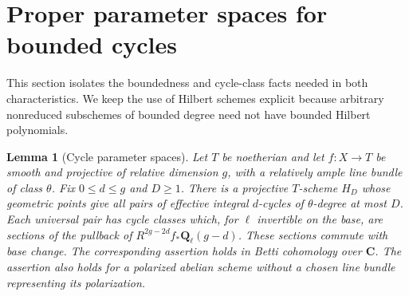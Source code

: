 \documentclass[11pt]{article}
\newtheorem{lemma}[theorem]{Lemma}
\theoremstyle{definition}
\theoremstyle{remark}
\newcommand{\Q}{\mathbf Q}
\newcommand{\C}{\mathbf C}
\begin{document}


\section{Proper parameter spaces for bounded cycles}
\label{sec:parameters}

This section isolates the boundedness and cycle-class facts needed in both characteristics. We keep the use of Hilbert schemes explicit because arbitrary nonreduced subschemes of bounded degree need not have bounded Hilbert polynomials.

\begin{lemma}[Cycle parameter spaces]\label{lem:parameters}
Let $T$ be noetherian and let $f:X\to T$ be smooth and projective of relative dimension $g$, with a relatively ample line bundle of class $\theta$. Fix $0\leq d\leq g$ and $D\geq1$. There is a projective $T$-scheme $H_D$ whose geometric points give all pairs of effective integral $d$-cycles of $\theta$-degree at most $D$. Each universal pair has cycle classes which, for $\ell$ invertible on the base, are sections of the pullback of $R^{2g-2d}f_*\Q_\ell(g-d)$. These sections commute with base change. The corresponding assertion holds in Betti cohomology over $\C$. The assertion also holds for a polarized abelian scheme without a chosen line bundle representing its polarization.
\end{lemma}
\end{document}
